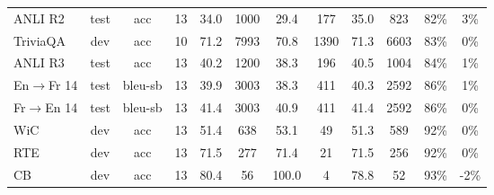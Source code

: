 \begin{table}
{\begin{adjustwidth}{-1.4in}{-1.4in}
\begin{center}
\begin{tabular}{lccccccccccc}
             ANLI R2 &  test &      acc &  13 &        34.0 &                      1000 &                            29.4 &                       177 &                            35.0 &                       823 &                            82\% &                                                 3\% \\
            TriviaQA &   dev &      acc &  10 &        71.2 &                      7993 &                            70.8 &                      1390 &                            71.3 &                      6603 &                            83\% &                                                 0\% \\
             ANLI R3 &  test &      acc &  13 &        40.2 &                      1200 &                            38.3 &                       196 &                            40.5 &                      1004 &                            84\% &                                                 1\% \\
        En$\to$Fr 14 &  test &  bleu-sb &  13 &        39.9 &                      3003 &                            38.3 &                       411 &                            40.3 &                      2592 &                            86\% &                                                 1\% \\
        Fr$\to$En 14 &  test &  bleu-sb &  13 &        41.4 &                      3003 &                            40.9 &                       411 &                            41.4 &                      2592 &                            86\% &                                                 0\% \\
                 WiC &   dev &      acc &  13 &        51.4 &                       638 &                            53.1 &                        49 &                            51.3 &                       589 &                            92\% &                                                 0\% \\
                 RTE &   dev &      acc &  13 &        71.5 &                       277 &                            71.4 &                        21 &                            71.5 &                       256 &                            92\% &                                                 0\% \\
                  CB &   dev &      acc &  13 &        80.4 &                        56 &                           100.0 &                         4 &                            78.8 &                        52 &                            93\% &                                                -2\% \\

\end{tabular}
\end{center}
\end{adjustwidth}}
\end{table}
